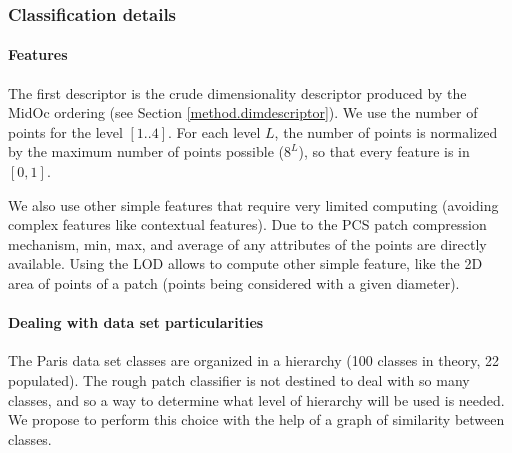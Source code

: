 		
		\subsubsection{Classification details}  
		\paragraph{Features}
		The first descriptor is the crude dimensionality descriptor produced by the MidOc ordering (see Section \ref{method.dimdescriptor}).
		We use the number of points for the level $[1..4]$. For each level $L$, the number of points is normalized by the maximum number of points possible ($8^L$), so that every feature is in $[0,1]$.
		
		We also use other simple features that require very limited computing (avoiding complex features like contextual features). 
		Due to the PCS patch compression mechanism,
		min, max, and average of any attributes of the points are directly available.
		Using the LOD allows to compute other simple feature, like the 2D area of points of a patch (points being considered with a given diameter). 
		
		\paragraph{Dealing with data set particularities}
		The Paris data set classes are organized in a hierarchy (100 classes in theory, 22 populated).
		The rough patch classifier is not destined to deal with so many classes,
		and so a way to determine what level of hierarchy will be used is needed.
		We propose to perform this choice with the help of a graph of similarity between classes.
	
